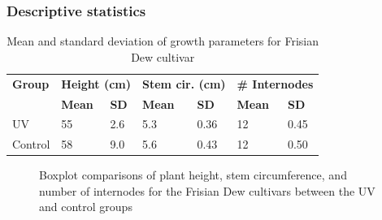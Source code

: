 \documentclass[
    12pt,
    aspectratio=1610,
    bibliography=../bibliography.bib,
    link-citations]{beamer}
\begin{document}
    \begin{frame}
        \frametitle{Descriptive statistics}
        \footnotesize
        \begin{table}
            \caption{Mean and standard deviation of growth parameters for Frisian Dew cultivar}
            \begin{tabular}{l|ll|ll|ll}
                \hline
                \hline
                \textbf{Group} & \multicolumn{2}{l|}{\textbf{Height (\unit[mode=text]{\cm})}} & \multicolumn{2}{l|}{\textbf{Stem cir. (\unit[mode=text]{\cm})}} & \multicolumn{2}{l}{\textbf{\# Internodes}} \\
                & \textbf{Mean} & \textbf{SD} & \textbf{Mean} & \textbf{SD} & \textbf{Mean} & \textbf{SD} \\
                \hline
                \hline
                UV & \num[mode=text]{55} & \num[mode=text]{2.6} & \num[mode=text]{5.3} & \num[mode=text]{0.36} & \num[mode=text]{12} & \num[mode=text]{0.45} \\
                Control & \num[mode=text]{58} & \num[mode=text]{9.0} & \num[mode=text]{5.6} & \num[mode=text]{0.43} & \num[mode=text]{12} & \num[mode=text]{0.50} \\
                \hline
                \hline
            \end{tabular}
        \end{table}
        \begin{figure}
            \begin{subfigure}[t]{.32\textwidth}
                
            \end{subfigure}
            \begin{subfigure}[t]{.32\textwidth}
                
            \end{subfigure}
            \begin{subfigure}[t]{.32\textwidth}
                
            \end{subfigure}
            \caption{Boxplot comparisons of plant height, stem circumference, and number of internodes for the Frisian Dew cultivars between the UV and control groups}
        \end{figure}
    \end{frame}
\end{document}
